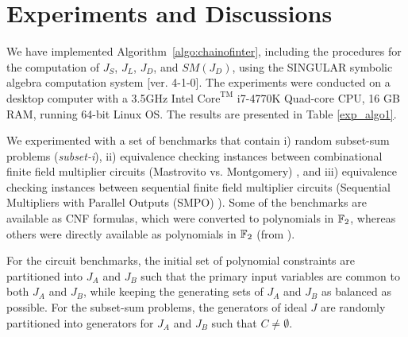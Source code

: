 \section{Experiments and Discussions}
\label{sec:exp}

We have implemented Algorithm~\ref{algo:chainofinter}, including the 
procedures for the computation of $J_S$, $J_L$, $J_D$, and $SM(J_D)$,
using the {\scshape SINGULAR} symbolic algebra computation system
[ver. 4-1-0]\cite{DGPS_410}. The experiments were conducted on a
desktop computer with a 3.5GHz Intel $\text{Core}^{\text{TM}}$
i7-4770K Quad-core CPU, 16 GB RAM, running 64-bit Linux OS. The
results are presented in Table \ref{exp_algo1}.   

\par We experimented with a set of benchmarks that contain i) random
subset-sum problems ({\it subset-i}), ii) equivalence checking
instances between combinational finite field multiplier circuits
(Mastrovito vs. Montgomery) %
 \cite{lv:date2012}, and iii) equivalence checking instances between
 sequential finite field multiplier circuits (Sequential Multipliers
 with Parallel Outputs (SMPO) \cite{agnew1991implementation}).
Some of the benchmarks are available 
as CNF formulas, which were converted to 
polynomials in ${\mathbb{F}}_2$,  whereas others were directly available as
polynomials in ${\mathbb{F}}_2$ (from \cite{xiaojun:cp2016}).

\par For the circuit benchmarks, the initial set of polynomial
constraints are partitioned into $J_A$ and $J_B$ such that the
primary input variables are common to both $J_A$ and $J_B$, while
keeping the generating sets of $J_A$ and $J_B$ as balanced as
possible. For the subset-sum problems, the generators of ideal $J$ are
randomly partitioned into generators for $J_A$ and $J_B$  such that $C
\neq \emptyset$.   

